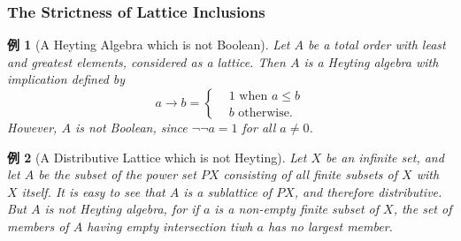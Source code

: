 \documentclass[a4j,12pt]{jarticle}
\numberwithin{equation}{section}
\newtheorem{example}{例}[section]
\begin{document}
\subsubsection{The Strictness of Lattice Inclusions}
\begin{example}[A Heyting Algebra which is not Boolean]
  Let $A$ be a total order with least and greatest elements, considered as a lattice.
  Then $A$ is a Heyting algebra with implication defined by
  \begin{equation}
    a \rightarrow b =
    \begin{cases}
      & 1 \text{ when } a \le b \\
      & b \text{ otherwise.}
    \end{cases}
  \end{equation}
  However, $A$ is not Boolean, since $\neg \neg a = 1$ for all $a \ne 0$.
\end{example}
\begin{example}[A Distributive Lattice which is not Heyting]
  Let $X$ be an infinite set, and let $A$ be the subset of the power set $PX$ consisting of all finite subsets of $X$ with $X$ itself.
  It is easy to see that $A$ is a sublattice of $PX$, and therefore distributive. But $A$ is not Heyting algebra, for if $a$ is a non-empty finite subset of $X$, the set of members of $A$ having empty intersection tiwh $a$ has no largest member.
\end{example}
\end{document}
